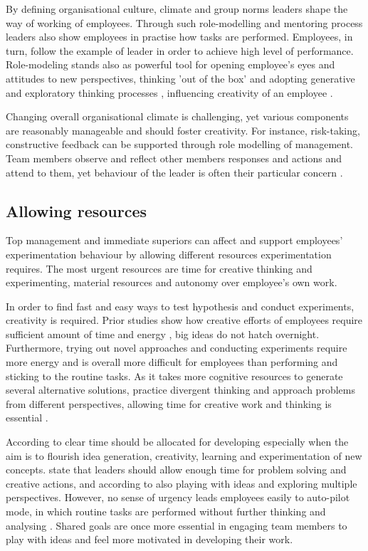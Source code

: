 By defining organisational culture, climate and group norms leaders shape the way of working of employees. Through such role-modelling and mentoring process leaders also show employees in practise how tasks are performed. Employees, in turn, follow the example of leader in order to achieve high level of performance. \citep{redmond1993putting} Role-modeling stands also as powerful tool for opening employee's eyes and attitudes to new perspectives, thinking 'out of the box' and adopting generative and exploratory thinking processes \citep{jung2003role,sternberg1997creativity}, influencing creativity of an employee \citep{shalley2004leaders}.

Changing overall organisational climate is challenging, yet various components are reasonably manageable and should foster creativity. For instance, risk-taking, constructive feedback can be supported through role modelling of management. \citep{shalley2004leaders} Team members observe and reflect other members responses and actions and attend to them, yet behaviour of the leader is often their particular concern \citep{tyler1992relational}.

\subsection{Allowing resources}
Top management and immediate superiors can affect and support employees' experimentation behaviour by allowing different resources experimentation requires. The most urgent resources are time for creative thinking and experimenting, material resources and autonomy over employee's own work\citet{amabile2008creativity,katz1985project}. 

In order to find fast and easy ways to test hypothesis and conduct experiments, creativity is required. Prior studies show how creative efforts of employees require sufficient amount of time and energy \citep{gardner1988creativity,getzels1975problem}, big ideas do not hatch overnight. Furthermore, trying out novel approaches and conducting experiments require more energy and is overall more difficult for employees than performing and sticking to the routine tasks. As it takes more cognitive resources to generate several alternative solutions, practice divergent thinking and approach problems from different perspectives, allowing time for creative work and thinking is essential \citep{amabile2002creativity,shalley2004leaders}. 

According to \citet{amabile2002creativity} clear time should be allocated for developing especially when the aim is to flourish idea generation, creativity, learning and experimentation of new concepts. \citet{redmond1993putting} state that leaders should allow enough time for problem solving and creative actions, and according to \citet{amabile1987creativity} also playing with ideas and exploring multiple perspectives. However, no sense of urgency leads employees easily to auto-pilot mode, in which routine tasks are performed without further thinking and analysing \citep{amabile2002creativity}. Shared goals are once more essential in engaging team members to play with ideas and feel more motivated in developing their work. \citep{amabile2002creativity} 

